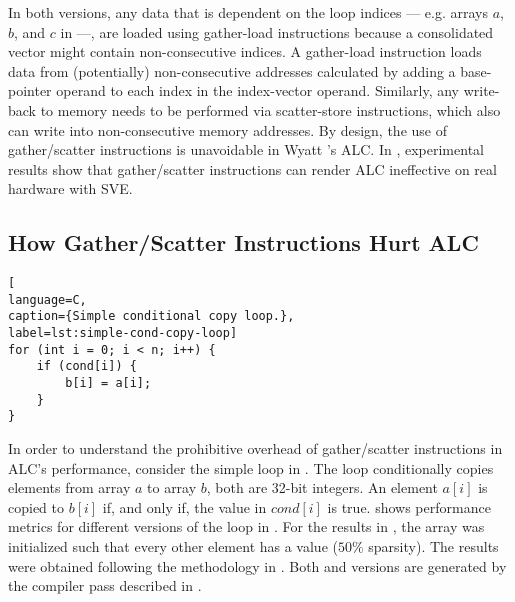 In both versions, any data that is dependent on the loop indices --- e.g. arrays $a$, $b$, and $c$ in  ---, are loaded using gather-load instructions because a consolidated vector might contain non-consecutive indices.
A gather-load instruction loads data from (potentially) non-consecutive addresses calculated by adding a base-pointer operand to each index in the index-vector operand.
Similarly, any write-back to memory needs to be performed via scatter-store instructions, which also can write into non-consecutive memory addresses.
By design, the use of gather/scatter instructions is unavoidable in Wyatt \etal's ALC.
In , experimental results show that gather/scatter instructions can render ALC ineffective on real hardware with SVE.

\subsection{How Gather/Scatter Instructions Hurt ALC}
\label{sec:gathers-scatters-are-bad}

\begin{center}
\begin{minipage}[t]{0.8\linewidth}
\begin{lstlisting}[
language=C,
caption={Simple conditional copy loop.},
label=lst:simple-cond-copy-loop]
for (int i = 0; i < n; i++) {
    if (cond[i]) {
        b[i] = a[i];
    }
}
\end{lstlisting} 
\end{minipage}
\end{center}


In order to understand the prohibitive overhead of gather/scatter instructions in ALC's performance, consider the simple loop in .
The loop conditionally copies elements from array $a$ to array $b$, both are 32-bit integers.
An element $a[i]$ is copied to $b[i]$  if, and only if, the value in $cond[i]$ is true.
 shows performance metrics for different versions of the loop in .
For the results in , the  array was initialized such that every other element has a  value ($50\%$ sparsity).
The results were obtained following the methodology in .
Both \ALC and \ALCdp versions are generated by the compiler pass described in .

